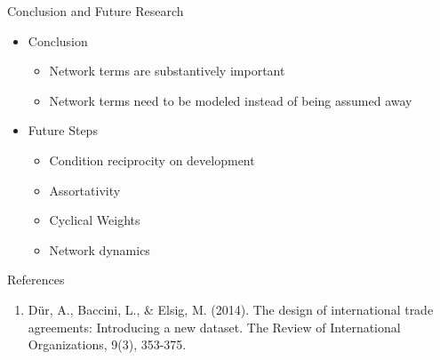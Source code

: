 \documentclass{beamer}
\begin{document}
\begin{frame}{Conclusion and Future Research}

\begin{itemize}
\item{Conclusion}
\begin{itemize}
\item{Network terms are substantively important}
\item{Network terms need to be modeled instead of being assumed away}
\end{itemize}
\item{Future Steps}
\begin{itemize}
\item{Condition reciprocity on development}
\item{Assortativity}
\item{Cyclical Weights}
\item{Network dynamics}
\end{itemize}
\end{itemize}





\end{frame}


\begin{frame}{References}
\begin{enumerate}
\item{D{\"u}r, A., Baccini, L., \& Elsig, M. (2014). The design of international trade agreements: Introducing a new dataset. The Review of International Organizations, 9(3), 353-375.}
\end{enumerate}
\end{frame}
\end{document}
